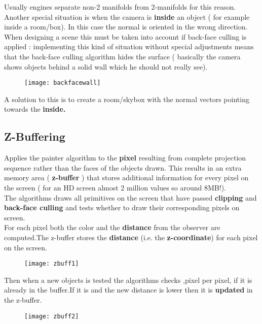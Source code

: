 Usually engines separate non-2 manifolds from 2-manifolds for this reason.\\
Another special situation is when the camera is \textbf{inside} an object ( for example inside a room/box). In this case the normal is oriented in the wrong direction. When designing a scene this must be taken into account if back-face culling is applied : implementing this kind of situation without special adjustments means that the back-face culling algorithm hides the surface ( basically the camera shows objects behind a solid wall which he should not really see). 
\begin{figure}[H]
  \centering
  \texttt{[image: backfacewall]}
\end{figure}
A solution to this is to create a room/skybox with the normal vectors pointing towards the \textbf{inside.}

\subsection{Z-Buffering}
Applies the painter algorithm to the \textbf{pixel} resulting from complete projection sequence rather than the faces of the objects drawn. This results in an extra memory area ( \textbf{z-buffer} ) that stores additional information for every pixel on the screen ( for an HD screen almost 2 million values so around 8MB!).\\
The algorithms draws all primitives on the screen that have passed \textbf{clipping} and \textbf{back-face culling} and tests whether to draw their corresponding pixels on screen.\\
For each pixel both the color and the \textbf{distance} from the observer are computed.The z-buffer stores the \textbf{distance} (i.e. the \textbf{z-coordinate}) for each pixel on the screen.
\begin{figure}[H]
  \centering
  \texttt{[image: zbuff1]}
\end{figure}
Then when a new objects is tested the algorithms checks ,pixel per pixel, if it is already in the buffer.If it is and the new distance is lower then it is \textbf{updated} in the z-buffer.
\begin{figure}[H]
  \centering
  \texttt{[image: zbuff2]}
\end{figure}

